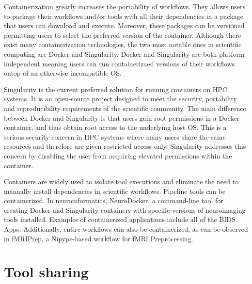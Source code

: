\documentclass{report}
\begin{document}
            Containerization greatly increases the portability of workflows. 
            They allows users to package their workflows and/or tools with all 
            their dependencies in a package that users can download and 
            execute. Moreover, these packages can be versioned permitting users 
            to select the preferred version of the container. Although there 
            exist many containerization technologies, the two most notable ones
            in scientific computing are Docker and Singularity. Docker and 
            Singularity are both platform independent meaning users can run
            containerizaed versions of their workflows ontop of an otherwise
            incompatible OS.

            Singularity is the current preferred solution for running 
            containers on HPC systems. It is an open-source project designed to
            meet the security, portability and reproducibility requirements of 
            the scientific community. The main difference between Docker and 
            Singularity is that users gain root permissions in a Docker 
            container, and thus obtain root access to the underlying host OS. 
            This is a serious security concern in HPC systems where many users
            share the same resources and therefore are given restricted access
            only. Singularity addresses this concern by disabling the user from
            acquiring elevated permissions within the container. 

            Containers are widely used to isolate tool executions and eliminate
            the need to manually install dependencies in scientific workflows.
            Pipeline tools can be containerized. In neuroinformatics, 
            NeuroDocker, a command-line tool for creating Docker and 
            Singularity containers with specific versions of neuroimaging tools
            installed. Examples of 
            containerized applications include all of the BIDS Apps. 
            Additionally, entire workflows can also be containerized, as can be
            observed in fMRIPrep, a Nipype-based workflow for fMRI 
            Preprocessing.
            
       \section{Tool sharing}\label{sharing}
\end{document}
